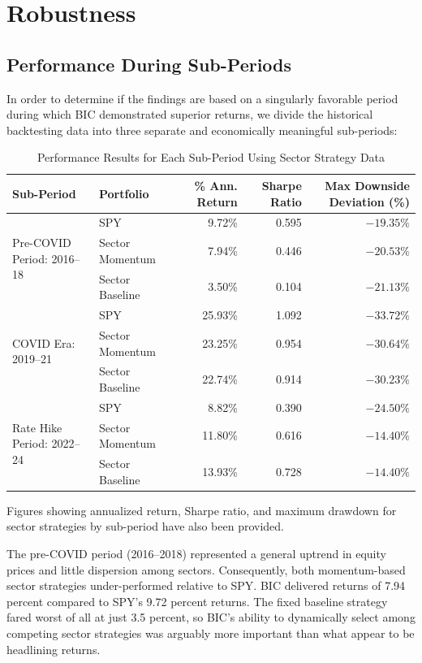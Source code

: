 \documentclass[12pt]{article}
\begin{document}
\section{Robustness}

\subsection{Performance During Sub-Periods}

In order to determine if the findings are based on a singularly favorable period during which BIC demonstrated superior returns, we divide the historical backtesting data into three separate and economically meaningful sub-periods:

\begin{table}[htbp]
\centering
\caption{Performance Results for Each Sub-Period Using Sector Strategy Data}
\label{tab:subperiod_sector}
\begin{tabular}{llrrr}
\toprule
\textbf{Sub-Period} &
\textbf{Portfolio} &
\textbf{\% Ann. Return} &
\textbf{Sharpe Ratio} &
\textbf{Max Downside Deviation (\%)} \\
\midrule
\multirow{3}{*}{Pre-COVID Period: 2016--18}
& SPY & 9.72\% & 0.595 & $-19.35\%$ \\
& Sector Momentum & 7.94\% & 0.446 & $-20.53\%$ \\
& Sector Baseline & 3.50\% & 0.104 & $-21.13\%$ \\
\midrule
\multirow{3}{*}{COVID Era: 2019--21}
& SPY & 25.93\% & 1.092 & $-33.72\%$ \\
& Sector Momentum & 23.25\% & 0.954 & $-30.64\%$ \\
& Sector Baseline & 22.74\% & 0.914 & $-30.23\%$ \\
\midrule
\multirow{3}{*}{Rate Hike Period: 2022--24}
& SPY & 8.82\% & 0.390 & $-24.50\%$ \\
& Sector Momentum & 11.80\% & 0.616 & $-14.40\%$ \\
& Sector Baseline & 13.93\% & 0.728 & $-14.40\%$ \\
\bottomrule
\end{tabular}
\end{table}

Figures showing annualized return, Sharpe ratio, and maximum drawdown for sector strategies by sub-period have also been provided.

The pre-COVID period (2016--2018) represented a general uptrend in equity prices and little dispersion among sectors. Consequently, both momentum-based sector strategies under-performed relative to SPY. BIC delivered returns of 7.94 percent compared to SPY's 9.72 percent returns. The fixed baseline strategy fared worst of all at just 3.5 percent, so BIC's ability to dynamically select among competing sector strategies was arguably more important than what appear to be headlining returns.
\end{document}
